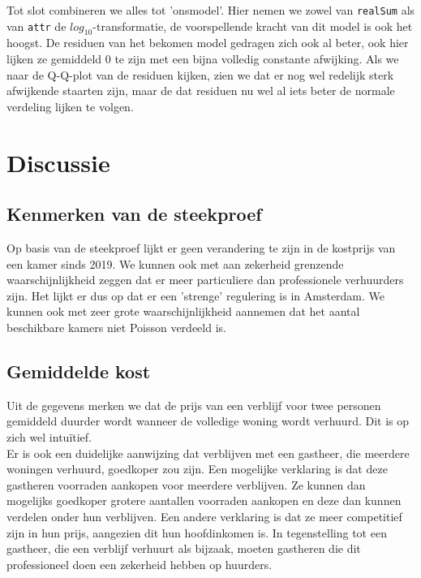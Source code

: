 \documentclass[a4paper]{kulakarticle}
\begin{document}
	Tot slot combineren we alles tot 'onsmodel'. Hier nemen we zowel van  \verb*|realSum| als van  \verb*|attr| de $log_{10}$-transformatie, de voorspellende kracht van dit model is ook het hoogst. De residuen van het bekomen model gedragen zich ook al beter, ook hier lijken ze gemiddeld $0$ te zijn met een bijna volledig constante afwijking. Als we naar de Q-Q-plot van de residuen kijken, zien we dat er nog wel redelijk sterk afwijkende staarten zijn, maar de dat residuen nu wel al iets beter de normale verdeling lijken te volgen.  
	
	\section{Discussie}
	
	\subsection{Kenmerken van de steekproef}
	Op basis van de steekproef lijkt er geen verandering te zijn in de kostprijs van een kamer sinds 2019. We kunnen ook met aan zekerheid grenzende waarschijnlijkheid zeggen dat er meer particuliere dan professionele verhuurders zijn. Het lijkt er dus op dat er een 'strenge' regulering is in Amsterdam. We kunnen ook met zeer grote waarschijnlijkheid aannemen dat het aantal beschikbare kamers niet Poisson verdeeld is.
	
	\subsection{Gemiddelde kost}
	
	Uit de gegevens merken we dat de prijs van een verblijf voor twee personen gemiddeld duurder wordt wanneer de volledige woning wordt verhuurd. Dit is op zich wel intuïtief.\\
	
	Er is ook een duidelijke aanwijzing dat verblijven met een gastheer, die meerdere woningen verhuurd, goedkoper zou zijn. Een mogelijke verklaring is dat deze gastheren voorraden aankopen voor meerdere verblijven. Ze kunnen dan mogelijks goedkoper grotere aantallen voorraden aankopen en deze dan kunnen verdelen onder hun verblijven. Een andere verklaring is dat ze meer competitief zijn in hun prijs, aangezien dit hun hoofdinkomen is. In tegenstelling tot een gastheer, die een verblijf verhuurt als bijzaak, moeten gastheren die dit professioneel doen een zekerheid hebben op huurders.\\
	
\end{document}
